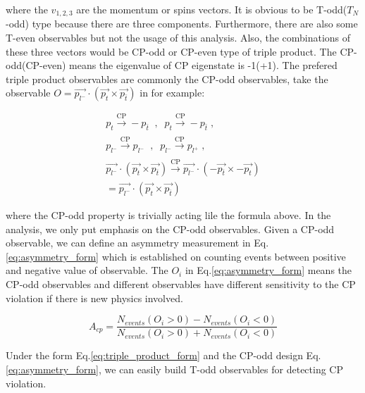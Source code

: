 		where the $v_{1,2,3}$ are the momentum or spins vectors. It is obvious to be T-odd($T_{N}$-odd) type because there are three components. Furthermore, there are also some T-even observables but not the usage of this analysis. Also, the combinations of these three vectors would be CP-odd or CP-even type of triple product. The CP-odd(CP-even) means the eigenvalue of CP eigenstate is -1(+1). The prefered triple product observables are commonly the CP-odd observables, take the observable $O = \vec{p_{l^-}} \cdot ( \vec{p_{t}} \times \vec{p_{\bar{t}}} )$ in \cite{PhysRevLett.58.451} for example:

		\begin{equation}
		\begin{split}
		p_{t}\xrightarrow[\text{}]{\text{CP}} -p_{\bar{t}} \; \; , \; \; p_{t}\xrightarrow[\text{}]{\text{CP}} -p_{\bar{t}} \; , \; \; \\
		p_{l^-} \xrightarrow[\text{}]{\text{CP}} p_{l^-} \; \; , \; \; p_{l^-} \xrightarrow[\text{}]{\text{CP}} p_{l^+} \;, \\
		\vec{p_{l^-}} \cdot ( \vec{p_{t}} \times \vec{p_{\overline{t}}} ) \xrightarrow[]{\text{CP}} \vec{p_{l^-}} \cdot ( - \vec{p_{\overline{t}}} \times - \vec{p_{t}} ) \\
		= \vec{p_{l^-}} \cdot ( \vec{p_{t}} \times \vec{p_{\overline{t}}} ) \;\;\;\;\;\;
		\end{split}
		\label{eq:ex_obs_eett}
		\end{equation}
		\FloatBarrier

		where the CP-odd property is trivially acting lile the formula above. In the analysis, we only put emphasis on the CP-odd observables. Given a CP-odd observable, we can define an asymmetry measurement in Eq.\ref{eq:asymmetry_form} which is established on counting events between positive and negative value of observable. The $O_i$ in Eq.\ref{eq:asymmetry_form} means the CP-odd observables and different observables have different sensitivity to the CP violation if there is new physics involved.

		\begin{equation}
		A_{cp} = \frac{ N_{events}(O_i>0) - N_{events}(O_i<0) }{ N_{events}(O_i>0) + N_{events}(O_i<0) }
		\label{eq:asymmetry_form}
		\end{equation}
		\FloatBarrier

		Under the form Eq.\ref{eq:triple_product_form} and the CP-odd design Eq.\ref{eq:asymmetry_form}, we can easily build T-odd observables for detecting CP violation. \\
		
